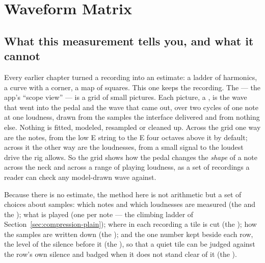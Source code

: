 \documentclass[11pt,a4paper]{article}
\begin{document}
\clearpage

\clearpage
\section{Waveform Matrix}
\label{sec:matrix-plain}

\subsection{What this measurement tells you, and what it cannot}

Every earlier chapter turned a recording into an estimate: a ladder of
harmonics, a curve with a corner, a map of squares. This one keeps the
recording. The  --- the app's ``scope view'' --- is
a grid of small pictures. Each picture, a , is the wave that
went into the pedal and the wave that came out, over two cycles of one
note at one loudness, drawn from the samples the interface delivered and
from nothing else. Nothing is fitted, modeled, resampled or cleaned up.
Across the grid one way are the notes, from the low E string to the E
four octaves above it by default; across it the other way are the
loudnesses, from a small signal to the loudest drive the rig allows. So
the grid shows how the pedal changes the \emph{shape} of a note across
the neck and across a range of playing loudness, as a set of recordings
a reader can check any model-drawn wave against.

Because there is no estimate, the method here is not arithmetic but a
set of choices about samples: which notes and which loudnesses are
measured (the  and the ); what
is played (one  per note --- the climbing ladder of
Section~\ref{sec:compression-plain}); where in each recording a tile is
cut (the ); how the samples are written down
(the ); and the one number kept beside each row, the
level of the silence before it (the ), so that a
quiet tile can be judged against the row's own silence and badged when it
does not stand clear of it (the ).
\end{document}
